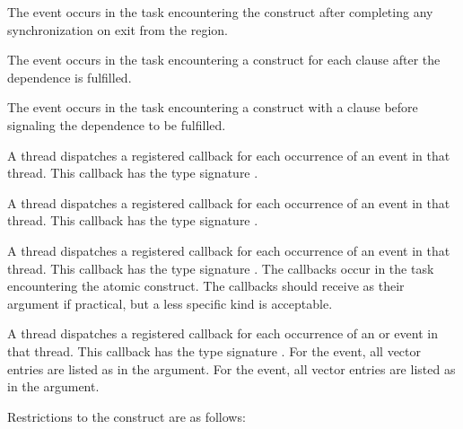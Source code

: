 The  event occurs in the task encountering the
 construct after completing any synchronization
on exit from the  region.

The  event occurs in the task encountering a
 construct for each {}
clause after the dependence is fulfilled.

The  event occurs in the task encountering a
 construct with a {} 
clause before signaling the dependence to be fulfilled.


\tools
A thread dispatches a registered 
callback for each occurrence of an  event
in that thread.
This callback has the type signature .

A thread dispatches a registered 
callback for each occurrence of an  event
in that thread.  This callback has the type signature .

A thread dispatches a registered 
callback for each occurrence of an  event
in that thread.  This callback has the type signature .
The callbacks occur in the task encountering the atomic construct.
The callbacks should receive 
as their  argument if practical, but a less specific kind is acceptable.

A thread dispatches a registered 
callback for each occurrence of an  or
 event in that thread.
This callback has the type signature .
For the  event, all vector entries are listed as 
 in the  argument.
For the  event, all vector entries are listed as 
 in the  argument.





\restrictions
Restrictions to the  construct are as follows:

